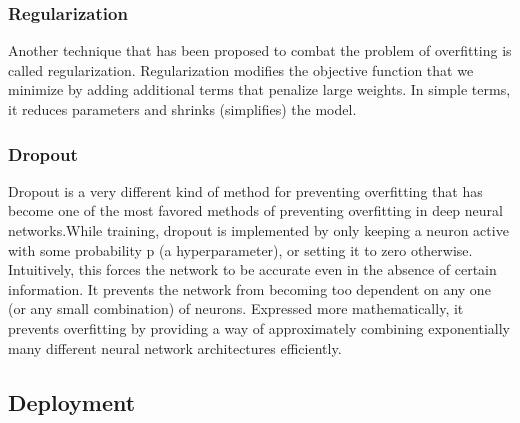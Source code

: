 \subsubsection{Regularization}
Another technique that has been proposed to combat the problem of overfitting is called regularization. Regularization modifies the objective function that we minimize by adding additional terms that penalize large weights. In simple terms, it reduces parameters and shrinks (simplifies) the model. 


\subsubsection{Dropout}
Dropout is a very different kind of method for preventing overfitting that has become one of the most favored methods of preventing overfitting in deep neural networks.While training, dropout is implemented by only keeping a neuron active with some probability p (a hyperparameter), or setting it to zero otherwise. Intuitively, this forces the network to be accurate even in the absence of certain information. It prevents the network from becoming too dependent on any one (or any small combination) of neurons. Expressed more mathematically, it prevents overfitting by providing a way of approximately combining exponentially many different neural network architectures efficiently.


\subsection{Deployment}








